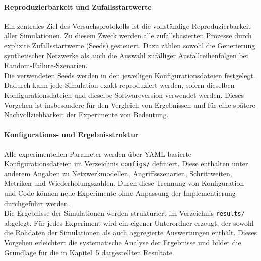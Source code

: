 \paragraph{Reproduzierbarkeit und Zufallsstartwerte}
Ein zentrales Ziel des Versuchsprotokolls ist die vollständige
Reproduzierbarkeit aller Simulationen. Zu diesem Zweck werden alle
zufallsbasierten Prozesse durch explizite Zufallsstartwerte (Seeds) gesteuert.
Dazu zählen sowohl die Generierung synthetischer Netzwerke als auch die
Auswahl zufälliger Ausfallreihenfolgen bei Random-Failure-Szenarien.\\
Die verwendeten Seeds werden in den jeweiligen Konfigurationsdateien
festgelegt. Dadurch kann jede Simulation exakt reproduziert werden, sofern
dieselben Konfigurationsdateien und dieselbe Softwareversion verwendet werden.
Dieses Vorgehen ist insbesondere für den Vergleich von Ergebnissen und für
eine spätere Nachvollziehbarkeit der Experimente von Bedeutung.

\paragraph{Konfigurations- und Ergebnisstruktur}
Alle experimentellen Parameter werden über YAML-basierte
Konfigurationsdateien im Verzeichnis \texttt{configs/} definiert. Diese
enthalten unter anderem Angaben zu Netzwerkmodellen, Angriffsszenarien,
Schrittweiten, Metriken und Wiederholungszahlen. Durch diese Trennung von
Konfiguration und Code können neue Experimente ohne Anpassung der
Implementierung durchgeführt werden.\\
Die Ergebnisse der Simulationen werden strukturiert im Verzeichnis
\texttt{results/} abgelegt. Für jedes Experiment wird ein eigener Unterordner
erzeugt, der sowohl die Rohdaten der Simulationen als auch aggregierte
Auswertungen enthält. Dieses Vorgehen erleichtert die systematische Analyse
der Ergebnisse und bildet die Grundlage für die in Kapitel~5 dargestellten
Resultate.

\newpage
% 
% 

% 